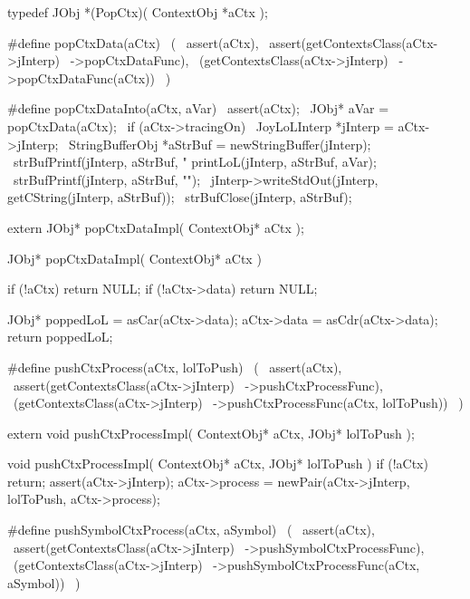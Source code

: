 \startCHeader
typedef JObj *(PopCtx)(
  ContextObj *aCtx
);

#define popCtxData(aCtx)                    \
  (                                         \
    assert(aCtx),                           \
    assert(getContextsClass(aCtx->jInterp)  \
      ->popCtxDataFunc),                    \
    (getContextsClass(aCtx->jInterp)        \
      ->popCtxDataFunc(aCtx))               \
  )

#define popCtxDataInto(aCtx, aVar)                              \
assert(aCtx);                                                   \
JObj* aVar = popCtxData(aCtx);                              \
if (aCtx->tracingOn) {                                          \
  JoyLoLInterp *jInterp = aCtx->jInterp;                        \
  StringBufferObj *aStrBuf = newStringBuffer(jInterp);          \
  strBufPrintf(jInterp, aStrBuf, "%
  printLoL(jInterp, aStrBuf, aVar);                             \
  strBufPrintf(jInterp, aStrBuf, "\n");                         \
  jInterp->writeStdOut(jInterp, getCString(jInterp, aStrBuf));  \
  strBufClose(jInterp, aStrBuf);                                \
}
\stopCHeader

\setCHeaderStream{private}
\startCHeader
extern JObj* popCtxDataImpl(
  ContextObj* aCtx
);
\stopCHeader
\setCHeaderStream{public}

\startCCode
JObj* popCtxDataImpl(
  ContextObj* aCtx
) {
  if (!aCtx) return NULL;
  if (!aCtx->data) return NULL;

  JObj* poppedLoL = asCar(aCtx->data);
  aCtx->data          = asCdr(aCtx->data);
  return poppedLoL;
}
\stopCCode

\startCHeader
#define pushCtxProcess(aCtx, lolToPush)        \
  (                                            \
    assert(aCtx),                              \
    assert(getContextsClass(aCtx->jInterp)     \
      ->pushCtxProcessFunc),                   \
    (getContextsClass(aCtx->jInterp)           \
      ->pushCtxProcessFunc(aCtx, lolToPush))   \
  )
\stopCHeader

\startCHeader
extern void pushCtxProcessImpl(
  ContextObj* aCtx,
  JObj* lolToPush
);
\stopCHeader
\setCHeaderStream{public}

\startCCode
void pushCtxProcessImpl(
  ContextObj* aCtx,
  JObj* lolToPush
) {
  if (!aCtx) return;
  assert(aCtx->jInterp);
  aCtx->process = newPair(aCtx->jInterp, lolToPush, aCtx->process);
}
\stopCCode

\startCHeader
#define pushSymbolCtxProcess(aCtx, aSymbol)      \
  (                                              \
    assert(aCtx),                                \
    assert(getContextsClass(aCtx->jInterp)       \
      ->pushSymbolCtxProcessFunc),               \
    (getContextsClass(aCtx->jInterp)             \
      ->pushSymbolCtxProcessFunc(aCtx, aSymbol)) \
  )
\stopCHeader

